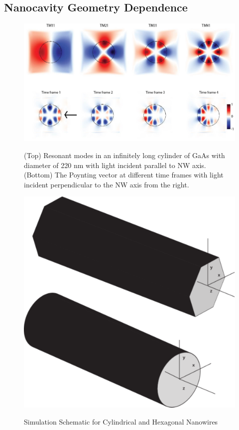 \subsection{Nanocavity Geometry Dependence}

\begin{figure}
  \caption{(Top) Resonant modes in an infinitely long cylinder of GaAs with diameter of 220 nm with light incident parallel to NW axis. (Bottom) The Poynting vector at different time frames with light incident perpendicular to the NW axis from the right.}
  \centering
  \includegraphics[width=\textwidth]{pictures/LM/CylindEz}
  \label{CylindEz}
\end{figure}

\begin{figure}
  \caption{Simulation Schematic for Cylindrical and Hexagonal Nanowires}
  \centering
  \includegraphics[width=\textwidth]{pictures/LM/NW}
  \label{NW}
\end{figure}

